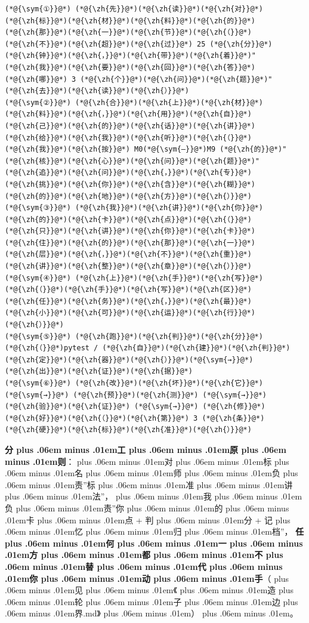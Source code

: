 \documentclass[
]{article}
\def\zh#1{{\zhfont #1}}
\def\sym#1{{\symfont #1}}
\def\zhglue{\hskip0pt plus .06em minus .01em}
\begin{document}
\begin{lstlisting}
(*@{\sym{①}}@*) (*@{\zh{先}}@*)(*@{\zh{读}}@*)(*@{\zh{对}}@*)(*@{\zh{标}}@*)(*@{\zh{材}}@*)(*@{\zh{料}}@*)(*@{\zh{的}}@*)(*@{\zh{那}}@*)(*@{\zh{一}}@*)(*@{\zh{节}}@*)(*@{\zh{（}}@*)(*@{\zh{不}}@*)(*@{\zh{超}}@*)(*@{\zh{过}}@*) 25 (*@{\zh{分}}@*)(*@{\zh{钟}}@*)(*@{\zh{，}}@*)(*@{\zh{带}}@*)(*@{\zh{着}}@*)"(*@{\zh{我}}@*)(*@{\zh{要}}@*)(*@{\zh{回}}@*)(*@{\zh{答}}@*)(*@{\zh{哪}}@*) 3 (*@{\zh{个}}@*)(*@{\zh{问}}@*)(*@{\zh{题}}@*)"(*@{\zh{去}}@*)(*@{\zh{读}}@*)(*@{\zh{）}}@*)
(*@{\sym{②}}@*) (*@{\zh{合}}@*)(*@{\zh{上}}@*)(*@{\zh{材}}@*)(*@{\zh{料}}@*)(*@{\zh{，}}@*)(*@{\zh{用}}@*)(*@{\zh{自}}@*)(*@{\zh{己}}@*)(*@{\zh{的}}@*)(*@{\zh{话}}@*)(*@{\zh{讲}}@*)(*@{\zh{给}}@*)(*@{\zh{我}}@*)(*@{\zh{听}}@*)(*@{\zh{（}}@*)(*@{\zh{我}}@*)(*@{\zh{按}}@*) M0(*@{\sym{–}}@*)M9 (*@{\zh{的}}@*)"(*@{\zh{核}}@*)(*@{\zh{心}}@*)(*@{\zh{问}}@*)(*@{\zh{题}}@*)"(*@{\zh{追}}@*)(*@{\zh{问}}@*)(*@{\zh{，}}@*)(*@{\zh{专}}@*)(*@{\zh{挑}}@*)(*@{\zh{你}}@*)(*@{\zh{含}}@*)(*@{\zh{糊}}@*)(*@{\zh{的}}@*)(*@{\zh{地}}@*)(*@{\zh{方}}@*)(*@{\zh{）}}@*)
(*@{\sym{③}}@*) (*@{\zh{我}}@*)(*@{\zh{讲}}@*)(*@{\zh{你}}@*)(*@{\zh{的}}@*)(*@{\zh{卡}}@*)(*@{\zh{点}}@*)(*@{\zh{（}}@*)(*@{\zh{只}}@*)(*@{\zh{讲}}@*)(*@{\zh{你}}@*)(*@{\zh{卡}}@*)(*@{\zh{住}}@*)(*@{\zh{的}}@*)(*@{\zh{那}}@*)(*@{\zh{一}}@*)(*@{\zh{层}}@*)(*@{\zh{，}}@*)(*@{\zh{不}}@*)(*@{\zh{重}}@*)(*@{\zh{讲}}@*)(*@{\zh{整}}@*)(*@{\zh{章}}@*)(*@{\zh{）}}@*)
(*@{\sym{④}}@*) (*@{\zh{上}}@*)(*@{\zh{手}}@*)(*@{\zh{写}}@*)(*@{\zh{（}}@*)(*@{\zh{手}}@*)(*@{\zh{写}}@*)(*@{\zh{区}}@*)(*@{\zh{任}}@*)(*@{\zh{务}}@*)(*@{\zh{，}}@*)(*@{\zh{最}}@*)(*@{\zh{小}}@*)(*@{\zh{可}}@*)(*@{\zh{运}}@*)(*@{\zh{行}}@*)(*@{\zh{）}}@*)
(*@{\sym{⑤}}@*) (*@{\zh{跑}}@*)(*@{\zh{判}}@*)(*@{\zh{分}}@*)(*@{\zh{（}}@*)pytest / (*@{\zh{自}}@*)(*@{\zh{建}}@*)(*@{\zh{判}}@*)(*@{\zh{定}}@*)(*@{\zh{器}}@*)(*@{\zh{）}}@*)(*@{\sym{→}}@*) (*@{\zh{出}}@*)(*@{\zh{证}}@*)(*@{\zh{据}}@*)
(*@{\sym{⑥}}@*) (*@{\zh{改}}@*)(*@{\zh{坏}}@*)(*@{\zh{它}}@*) (*@{\sym{→}}@*) (*@{\zh{预}}@*)(*@{\zh{测}}@*) (*@{\sym{→}}@*) (*@{\zh{验}}@*)(*@{\zh{证}}@*) (*@{\sym{→}}@*) (*@{\zh{修}}@*)(*@{\zh{好}}@*)(*@{\zh{（}}@*)(*@{\zh{第}}@*) 3 (*@{\zh{条}}@*)(*@{\zh{硬}}@*)(*@{\zh{标}}@*)(*@{\zh{准}}@*)(*@{\zh{）}}@*)
\end{lstlisting}

\textbf{\zh{分\zhglue 工\zhglue 原\zhglue 则}}\zh{：\zhglue 对\zhglue 标\zhglue 名\zhglue 师\zhglue 负\zhglue 责}''\zh{标\zhglue 准\zhglue 讲\zhglue 法}''\zh{，\zhglue 我\zhglue 负\zhglue 责}''\zh{你\zhglue 的\zhglue 卡\zhglue 点} + \zh{判\zhglue 分} + \zh{记\zhglue 忆\zhglue 归\zhglue 档}''\zh{，} \textbf{\zh{任\zhglue 何\zhglue 一\zhglue 方\zhglue 都\zhglue 不\zhglue 替\zhglue 代\zhglue 你\zhglue 动\zhglue 手}}\zh{（\zhglue 见\zhglue 《\zhglue 造\zhglue 轮\zhglue 子\zhglue 边\zhglue 界}.md\zh{》\zhglue ）\zhglue 。}
\end{document}
